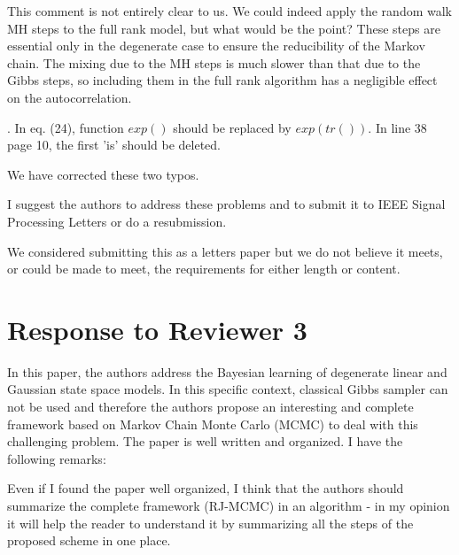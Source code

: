 \documentclass{article}
\newenvironment{review}[0]{\begin{itshape}\color{Gray}\noindent}{\end{itshape}\vspace{0.4cm}}
\newenvironment{response}[0]{\noindent}{\vspace{0.4cm}}
\begin{document}
\begin{response}
This comment is not entirely clear to us. We could indeed apply the random walk MH steps to the full rank model, but what would be the point? These steps are essential only in the degenerate case to ensure the reducibility of the Markov chain. The mixing due to the MH steps is much slower than that due to the Gibbs steps, so including them in the full rank algorithm has a negligible effect on the autocorrelation.
\end{response}

\begin{review}
8.  In eq. (24), function $exp()$ should be replaced by $exp(tr())$. In line 38 page 10, the first 'is' should be deleted.
\end{review}

\begin{response}
 We have corrected these two typos.
\end{response}

\begin{review}
I suggest the authors to address these problems and to submit it to IEEE Signal Processing Letters or do a resubmission.
\end{review}

\begin{response}
 We considered submitting this as a letters paper but we do not believe it meets, or could be made to meet, the requirements for either length or content.
\end{response}


\section*{Response to Reviewer 3}

\begin{review}
In this paper, the authors address the Bayesian learning of degenerate linear and Gaussian state space models. In this specific context, classical Gibbs sampler can not be used and therefore the authors propose an interesting and complete framework based on Markov Chain Monte Carlo (MCMC) to deal with this challenging problem. The paper is well written and organized. I have the following remarks:

Even if I found the paper well organized, I think that the authors should summarize the complete framework (RJ-MCMC) in an algorithm - in my opinion it will help the reader to understand it by summarizing all the steps of the proposed scheme in one place.
\end{review}
\end{document}
